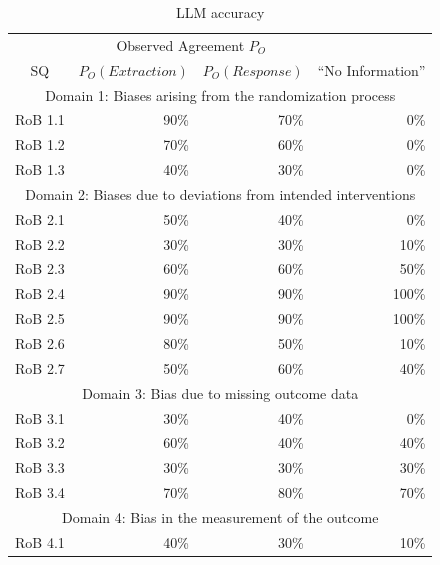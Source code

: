 \documentclass[sn-mathphys,Numbered]{sn-jnl}%
\theoremstyle{thmstyleone}%
\theoremstyle{thmstyletwo}%
\theoremstyle{thmstylethree}%
\begin{document}
%
%
%
\begin{table}[htb]
    \caption{LLM accuracy}
    \label{table:LLM_eval}
    \centering
    \begin{tabular}{crrr}
    \toprule[1.0pt]
     & \multicolumn{2}{c}{Observed Agreement $P_{O}$} \\
        SQ & $P_{O} (Extraction)$ & $P_{O} (Response)$ & ``No Information'' \\ 
    \midrule[1.0pt]
        \multicolumn{4}{c}{Domain 1: Biases arising from the randomization process} \\
        \hline
        RoB 1.1 & 90\% & 70\% & 0\% \\ 
        RoB 1.2 & 70\% & 60\% & 0\% \\ 
        RoB 1.3 & 40\% & 30\% & 0\% \\ 
        \hline
        \multicolumn{4}{c}{Domain 2: Biases due to deviations from intended interventions} \\
        \hline
        RoB 2.1 & 50\% & 40\% & 0\% \\
        RoB 2.2 & 30\% & 30\% & 10\% \\ 
        RoB 2.3 & 60\% & 60\% & 50\% \\ 
        RoB 2.4 & 90\% & 90\% & 100\% \\ 
        RoB 2.5 & 90\% & 90\% & 100\% \\ 
        RoB 2.6 & 80\% & 50\% & 10\% \\ 
        RoB 2.7 & 50\% & 60\% & 40\% \\
        \hline
        \multicolumn{4}{c}{Domain 3: Bias due to missing outcome data} \\
        \hline
        RoB 3.1 & 30\% & 40\% & 0\% \\ 
        RoB 3.2 & 60\% & 40\% & 40\% \\ 
        RoB 3.3 & 30\% & 30\% & 30\% \\ 
        RoB 3.4 & 70\% & 80\% & 70\% \\ 
        \hline
        \multicolumn{4}{c}{Domain 4: Bias in the measurement of the outcome} \\
        \hline
        RoB 4.1 & 40\% & 30\% & 10\% \\ 

\end{tabular}
\end{table}
\end{document}
